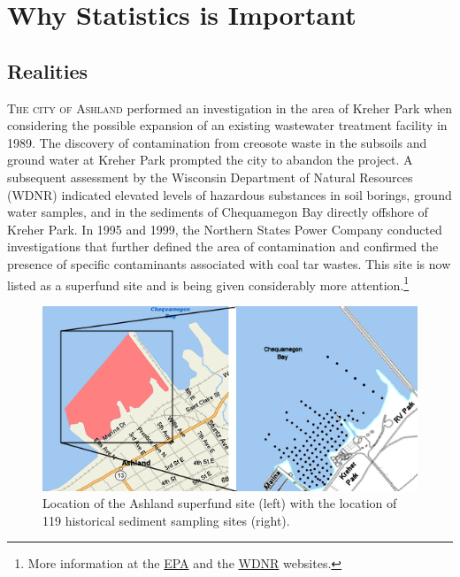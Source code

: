 \documentclass[10pt,openany]{book}\usepackage[]{graphicx}\usepackage[]{color}
\begin{document}
  \frontmatter
    

  \mainmatter



\chapter{Why Statistics is Important} \label{chap:WhyStatsImportant}

\minitoc

\section{Realities}\label{sect:Realities}
\lettrine{T}{he city of Ashland} performed an investigation in the area of Kreher Park  when considering the possible expansion of an existing wastewater treatment facility in 1989. The discovery of contamination from creosote waste in the subsoils and ground water at Kreher Park prompted the city to abandon the project. A subsequent assessment by the Wisconsin Department of Natural Resources (WDNR) indicated elevated levels of hazardous substances in soil borings, ground water samples, and in the sediments of Chequamegon Bay directly offshore of Kreher Park. In 1995 and 1999, the Northern States Power Company conducted investigations that further defined the area of contamination and confirmed the presence of specific contaminants associated with coal tar wastes. This site is now listed as a superfund site and is being given considerably more attention.\footnote{More information at the \href{https://cumulis.epa.gov/supercpad/cursites/csitinfo.cfm?id=0507952}{EPA} and the \href{http://dnr.wi.gov/topic/brownfields/ashland.html}{WDNR} websites.}

\begin{figure}[htbp]
  \centering
    \includegraphics[width=6in]{Figs/Kreher_Park_Map.png}
  \caption{Location of the Ashland superfund site (left) with the location of 119 historical sediment sampling sites (right).}
  \label{fig:KreherParkMap}
\end{figure}
\end{document}
